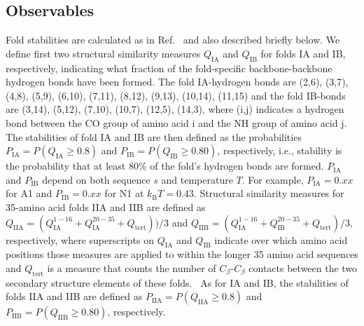 \documentclass[%
 aip,
rsi,%
 amsmath,amssymb,
 reprint,%
]{revtex4-1}
\newcommand	 {\sbar}	{{s}}
\newcommand	 {\kb}		{{k_\mathrm{B}}}
\newcommand {\QIA}	{{Q_\mathrm{IA}}}
\newcommand {\QIB}	{{Q_\mathrm{IB}}}
\newcommand {\QIIA}	{{Q_\mathrm{IIA}}}
\newcommand {\QIIB}	{{Q_\mathrm{IIB}}}
\newcommand {\PIA}    	{{P_\mathrm{IA}}}
\newcommand {\PIB}    	{{P_\mathrm{IB}}}
\newcommand {\PIIA}    	{{P_\mathrm{IIA}}}
\newcommand {\PIIB}    	{{P_\mathrm{IIB}}}
\begin{document}
\subsection{Observables}
\noindent
Fold stabilities are calculated as in Ref.~ and also described briefly below. We define first two structural similarity measures $\QIA$ and $\QIB$ for folds IA and IB, respectively, indicating what fraction of the fold-specific backbone-backbone hydrogen bonds have been formed. The fold IA-hydrogen bonds are (2,6), (3,7), (4,8), (5,9), (6,10), (7,11), (8,12), (9,13), (10,14), (11,15) and the fold IB-bonds are (3,14), (5,12), (7,10), (10,7), (12,5), (14,3), where (i,j) indicates a hydrogen bond between the CO group of amino acid i and the NH group of amino acid j. The  stabilities of fold IA and IB are then defined as the probabilities $\PIA = P(\QIA\ge0.8)$ and $\PIB = P(\QIB\ge0.80)$, respectively, i.e., stability is the probability that at least 80\% of the fold's hydrogen bonds are formed. $\PIA$ and $\PIB$ depend on both sequence $\sbar$ and temperature $T$. For example, $\PIA=0.xx$ for A1 and $\PIB=0.xx$ for N1 at $\kb T = 0.43$. Structural similarity measures for 35-amino acid folds IIA and IIB are defined as $\QIIA = ( Q_\mathrm{IA}^\mathrm{1-16} + Q_\mathrm{IA}^\mathrm{20-35} + Q_\mathrm{tert}) ) / 3$ and $\QIIB = ( Q_\mathrm{IA}^\mathrm{1-16} + Q_\mathrm{IB}^\mathrm{20-35} + Q_\mathrm{tert} ) / 3$, respectively, where superscripts on $\QIA$ and $\QIB$ indicate over which amino acid positions those measures are applied to within the longer 35 amino acid sequences and $Q_\mathrm{tert}$ is a measure that counts the number of $C_\beta$-$C_\beta$ contacts between the two secondary structure elements of these folds.~\cite{Holzgrafe2015} As for IA and IB, the stabilities of folds IIA and IIB are defined as $\PIIA = P(\QIIA\ge0.8)$ and $\PIIB = P(\QIIB\ge0.80)$, respectively. 
\end{document}

